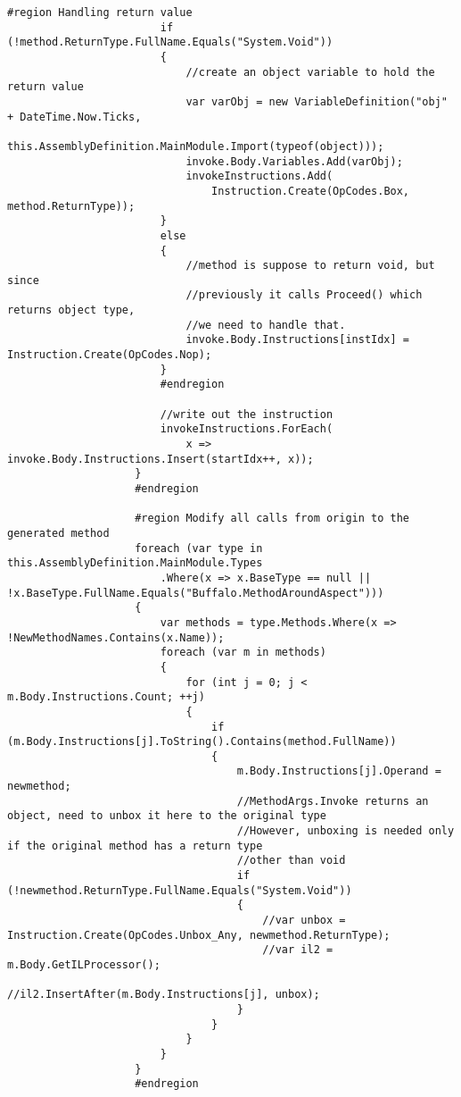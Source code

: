 \begin{lstlisting}[caption={../buffalo/Injectors/MethodAroundInjector.cs}, label=../buffalo/Injectors/MethodAroundInjector.cs, frame=tb, basicstyle=\scriptsize]
                        #region Handling return value
                        if (!method.ReturnType.FullName.Equals("System.Void"))
                        {
                            //create an object variable to hold the return value
                            var varObj = new VariableDefinition("obj" + DateTime.Now.Ticks,
                                this.AssemblyDefinition.MainModule.Import(typeof(object)));
                            invoke.Body.Variables.Add(varObj);
                            invokeInstructions.Add(
                                Instruction.Create(OpCodes.Box, method.ReturnType));
                        }
                        else
                        {
                            //method is suppose to return void, but since
                            //previously it calls Proceed() which returns object type,
                            //we need to handle that.
                            invoke.Body.Instructions[instIdx] = Instruction.Create(OpCodes.Nop);
                        }
                        #endregion

                        //write out the instruction
                        invokeInstructions.ForEach(
                            x => invoke.Body.Instructions.Insert(startIdx++, x));
                    }
                    #endregion

                    #region Modify all calls from origin to the generated method
                    foreach (var type in this.AssemblyDefinition.MainModule.Types
                        .Where(x => x.BaseType == null || !x.BaseType.FullName.Equals("Buffalo.MethodAroundAspect")))
                    {
                        var methods = type.Methods.Where(x => !NewMethodNames.Contains(x.Name));
                        foreach (var m in methods)
                        {
                            for (int j = 0; j < m.Body.Instructions.Count; ++j)
                            {
                                if (m.Body.Instructions[j].ToString().Contains(method.FullName))
                                {
                                    m.Body.Instructions[j].Operand = newmethod;
                                    //MethodArgs.Invoke returns an object, need to unbox it here to the original type
                                    //However, unboxing is needed only if the original method has a return type
                                    //other than void
                                    if (!newmethod.ReturnType.FullName.Equals("System.Void"))
                                    {
                                        //var unbox = Instruction.Create(OpCodes.Unbox_Any, newmethod.ReturnType);
                                        //var il2 = m.Body.GetILProcessor();
                                        //il2.InsertAfter(m.Body.Instructions[j], unbox);
                                    }
                                }
                            }
                        }
                    }
                    #endregion


\end{lstlisting}
